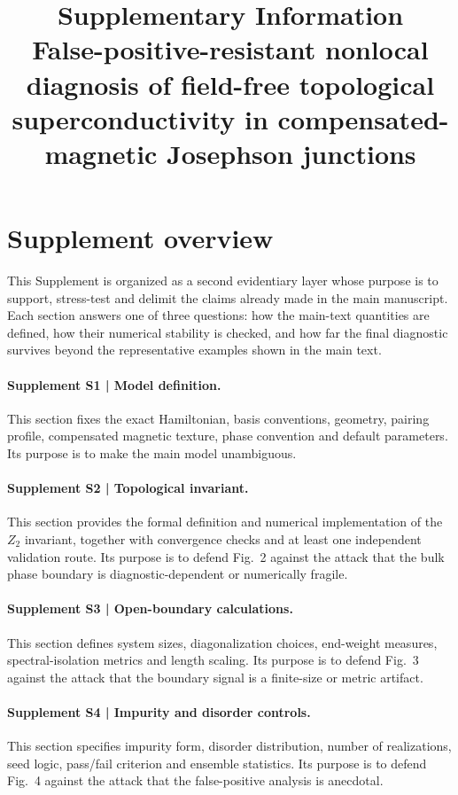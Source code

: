 \documentclass[11pt]{article}
\title{\textbf{Supplementary Information}\\
False-positive-resistant nonlocal diagnosis of field-free topological superconductivity in compensated-magnetic Josephson junctions}
\author{}
\date{}
\begin{document}
\maketitle

\section*{Supplement overview}

This Supplement is organized as a second evidentiary layer whose purpose is to support, stress-test and delimit the claims already made in the main manuscript. Each section answers one of three questions: how the main-text quantities are defined, how their numerical stability is checked, and how far the final diagnostic survives beyond the representative examples shown in the main text.

\paragraph{Supplement S1 | Model definition.}
This section fixes the exact Hamiltonian, basis conventions, geometry, pairing profile, compensated magnetic texture, phase convention and default parameters. Its purpose is to make the main model unambiguous.

\paragraph{Supplement S2 | Topological invariant.}
This section provides the formal definition and numerical implementation of the $Z_2$ invariant, together with convergence checks and at least one independent validation route. Its purpose is to defend Fig.~2 against the attack that the bulk phase boundary is diagnostic-dependent or numerically fragile.

\paragraph{Supplement S3 | Open-boundary calculations.}
This section defines system sizes, diagonalization choices, end-weight measures, spectral-isolation metrics and length scaling. Its purpose is to defend Fig.~3 against the attack that the boundary signal is a finite-size or metric artifact.

\paragraph{Supplement S4 | Impurity and disorder controls.}
This section specifies impurity form, disorder distribution, number of realizations, seed logic, pass/fail criterion and ensemble statistics. Its purpose is to defend Fig.~4 against the attack that the false-positive analysis is anecdotal.
\end{document}
